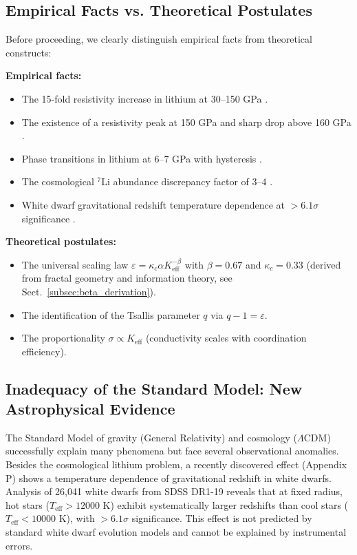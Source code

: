 \documentclass[12pt,a4paper]{article}
\theoremstyle{remark}
\newcommand{\Ke}{K_{\mathrm{eff}}}
\newcommand{\kappac}{\kappa_c}
\newcommand{\alp}{\alpha}
\begin{document}
	\subsection{Empirical Facts vs. Theoretical Postulates}
	
	Before proceeding, we clearly distinguish empirical facts from theoretical constructs:
	
	\textbf{Empirical facts:}
	\begin{itemize}
		\item The 15-fold resistivity increase in lithium at 30–150 GPa \cite{fortov2001}.
		\item The existence of a resistivity peak at 150 GPa and sharp drop above 160 GPa \cite{yakushev2002}.
		\item Phase transitions in lithium at 6–7 GPa with hysteresis \cite{orlov2001}.
		\item The cosmological \(^7\)Li abundance discrepancy factor of 3–4 \cite{bertulani2015}.
		\item White dwarf gravitational redshift temperature dependence at \(>6.1\sigma\) significance \cite{Crumpler2024}.
	\end{itemize}
	
	\textbf{Theoretical postulates:}
	\begin{itemize}
		\item The universal scaling law \(\varepsilon = \kappac \alp \Ke^{-\beta}\) with \(\beta = 0.67\) and \(\kappac = 0.33\) (derived from fractal geometry and information theory, see Sect.~\ref{subsec:beta_derivation}).
		\item The identification of the Tsallis parameter \(q\) via \(q-1 = \varepsilon\).
		\item The proportionality \(\sigma \propto \Ke\) (conductivity scales with coordination efficiency).
	\end{itemize}
	
	\subsection{Inadequacy of the Standard Model: New Astrophysical Evidence}
	\label{subsec:std-inadequacy}
	
	The Standard Model of gravity (General Relativity) and cosmology (\(\Lambda\)CDM) successfully explain many phenomena but face several observational anomalies. Besides the cosmological lithium problem, a recently discovered effect (Appendix P) shows a temperature dependence of gravitational redshift in white dwarfs. Analysis of 26,041 white dwarfs from SDSS DR1-19 \cite{Crumpler2024} reveals that at fixed radius, hot stars (\(T_{\mathrm{eff}} > 12000\) K) exhibit systematically larger redshifts than cool stars (\(T_{\mathrm{eff}} < 10000\) K), with \(>6.1\sigma\) significance. This effect is not predicted by standard white dwarf evolution models and cannot be explained by instrumental errors.
	
\end{document}
